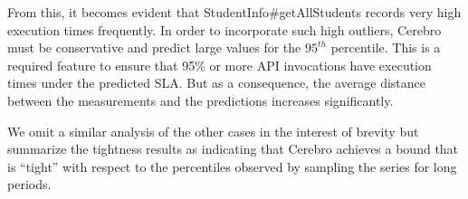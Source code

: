 From this, it becomes evident that StudentInfo\#getAll\-Students 
records very high execution times frequently. 
In order to incorporate such high outliers, Cerebro must be conservative 
and predict large values for
the $95^{th}$ percentile. This is a required feature to ensure that 95\% or more 
API invocations have
execution times under the predicted SLA. But as a consequence, the average 
distance between the 
measurements and the predictions increases significantly.

We omit a similar analysis of the other cases in the interest of brevity 
but summarize the tightness results as indicating that Cerebro achieves a
bound that is ``tight'' with respect to the percentiles observed by sampling
the series for long periods. 

%

